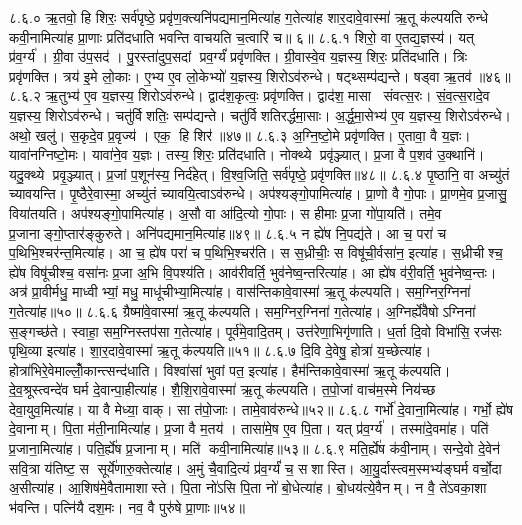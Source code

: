 ८.६.०
ऋ॒तवो॒ हि शिरः॒ सर्व॑पृष्ठे॒ प्रवृ॑ण॒क्त्यनि॑पद्यमान॒मित्या॑ह ग॒तेत्या॑ह शार॒दावे॒वास्मा॑ ऋ॒तू क॑ल्पयति रुन्धे कवी॒नामित्या॑ह प्रा॒णाः प्रति॑दधाति भवन्ति वाचयति च॒त्वारि॑ च॥ ६॥
८.६.१
शिरो॒ वा ए॒तद्य॒ज्ञस्य॑। यत् प्र॑व॒र्ग्य॑। ग्री॒वा उ॑प॒सद॑। पु॒रस्ता॑दुप॒सदां प्रव॒र्ग्यं॑ प्रवृ॑णक्ति। ग्री॒वास्वे॒व य॒ज्ञस्य॒ शिरः॒ प्रति॑दधाति। त्रिः प्रवृ॑णक्ति। त्रय॑ इ॒मे लो॒काः। ए॒भ्य ए॒व लो॒केभ्यो॑ य॒ज्ञस्य॒ शिरोऽव॑रुन्धे। षट्थ्सम्प॑द्यन्ते। षड्वा ऋ॒तव॑॥४६॥
८.६.२
ऋ॒तुभ्य॑ ए॒व य॒ज्ञस्य॒ शिरोऽव॑रुन्धे। द्वाद॑श॒कृत्वः॒ प्रवृ॑णक्ति। द्वाद॑श॒ मासा संवत्स॒रः। सं॒व॒त्स॒रादे॒व य॒ज्ञस्य॒ शिरोऽव॑रुन्धे। चतु॑र्विशतिः॒ सम्प॑द्यन्ते। चतु॑र्विशतिरर्द्धमा॒साः। अ॒र्द्ध॒मा॒सेभ्य॑ ए॒व य॒ज्ञस्य॒ शिरोऽव॑रुन्धे। अथो॒ खलु॑। स॒कृदे॒व प्र॒वृज्य॑। एक॒ हि शिर॑॥४७॥
८.६.३
अ॒ग्नि॒ष्टो॒मे प्रवृ॑णक्ति। ए॒तावा॒\an{} वै य॒ज्ञः। यावा॑नग्निष्टो॒मः। यावा॑ने॒व य॒ज्ञः। तस्य॒ शिरः॒ प्रति॑दधाति। नोक्थ्ये प्रवृ॑ञ्ज्यात्। प्र॒जा वै प॒शव॑ उ॒क्थानि॑। यदु॒क्थ्ये प्रवृ॒ञ्ज्यात्। प्र॒जां प॒शून॑स्य॒ निर्द॑हेत्। वि॒श्व॒जिति॒ सर्व॑पृष्ठे॒ प्रवृ॑णक्ति॥४८॥
८.६.४
पृ॒ष्ठानि॒ वा अच्यु॑तं च्यावयन्ति। पृ॒ष्ठैरे॒वास्मा॒ अच्यु॑तं च्यावयि॒त्वाऽव॑रुन्धे। अप॑श्यङ्गो॒पामित्या॑ह। प्रा॒णो वै गो॒पाः। प्रा॒णमे॒व प्र॒जासु॒ विया॑तयति। अप॑श्यङ्गो॒पामित्या॑ह। अ॒सौ वा आ॑दि॒त्यो गो॒पाः। स हीमाः प्र॒जा गो॑पा॒यति॑। तमे॒व प्र॒जानाङ्गो॒प्तार॑ङ्कुरुते। अनि॑पद्यमान॒मित्या॑ह॥४९॥
८.६.५
न ह्ये॑ष नि॒पद्य॑ते। आ च॒ परा॑ च प॒थिभि॒श्चर॑न्त॒मित्या॑ह। आ च॒ ह्ये॑ष परा॑ च प॒थिभि॒श्चर॑ति। स स॒ध्रीचीः॒ स विषू॑ची॒र्वसा॑न॒ इत्या॑ह। स॒ध्रीचीश्च॒ ह्ये॑ष विषू॑चीश्च॒ वसा॑नः प्र॒जा अ॒भि वि॒पश्य॑ति। आव॑रीवर्ति॒ भुव॑नेष्व॒न्तरित्या॑ह। आ ह्ये॑ष व॑री॒वर्ति॒ भुव॑नेष्व॒न्तः। अत्र॑ प्रा॒वीर्मधु॒ माध्वीभ्यां॒ मधु॒ माधू॑चीभ्या॒मित्या॑ह। वास॑न्तिकावे॒वास्मा॑ ऋ॒तू क॑ल्पयति। सम॒ग्निर॒ग्निना॑ ग॒तेत्या॑ह॥५०॥
८.६.६
ग्रैष्मा॑वे॒वास्मा॑ ऋ॒तू क॑ल्पयति। सम॒ग्निर॒ग्निना॑ ग॒तेत्या॑ह। अ॒ग्निर्ह्ये॑वैषोऽग्निना॑ स॒ङ्गच्छ॑ते। स्वाहा॒ सम॒ग्निस्तप॑सा ग॒तेत्या॑ह। पूर्व॑मे॒वादि॒तम्। उत्त॑रेणा॒भिगृ॑णाति। ध॒र्ता दि॒वो विभा॑सि॒ रज॑सः पृथि॒व्या इत्या॑ह। शा॒र॒दावे॒वास्मा॑ ऋ॒तू क॑ल्पयति॥५१॥
८.६.७
दि॒वि दे॒वेषु॒ होत्रा॑ य॒च्छेत्या॑ह। होत्रा॑भिरे॒वेमाल्लोँ॒कान्त्सन्द॑धाति। विश्वा॑सां भुवां पत॒ इत्या॑ह। हैम॑न्तिकावे॒वास्मा॑ ऋ॒तू क॑ल्पयति। दे॒व॒श्रूस्त्वन्दे॑व घर्म दे॒वान्पा॒हीत्या॑ह। शै॒शि॒रावे॒वास्मा॑ ऋ॒तू क॑ल्पयति। त॒पो॒जां वाच॑म॒स्मे निय॑च्छ देवा॒युव॒मित्या॑ह। या वै मेध्या॒ वाक्। सा त॑पो॒जाः। तामे॒वाव॑रुन्धे॥५२॥
८.६.८
गर्भो॑ दे॒वाना॒मित्या॑ह। गर्भो॒ ह्ये॑ष दे॒वानाम्। पि॒ता म॑ती॒नामित्या॑ह। प्र॒जा वै म॒तय॑। तासा॑मे॒ष ए॒व पि॒ता। यत् प्र॑व॒र्ग्य॑। तस्मा॑दे॒वमा॑ह। पति॑ प्र॒जाना॒मित्या॑ह। पति॒र्ह्ये॑ष प्र॒जानाम्। मति॑ कवी॒नामित्या॑ह॥५३॥
८.६.९
मति॒र्ह्ये॑ष क॑वी॒नाम्। सन्दे॒वो दे॒वेन॑ सवि॒त्रा य॑तिष्ट॒ स सूर्ये॑णारु॒क्तेत्या॑ह। अ॒मुं चै॒वादि॒त्यं प्र॑व॒र्ग्यं॑ च॒ सशास्ति। आ॒यु॒र्दास्त्वम॒स्मभ्य॑ङ्घर्म वर्चो॒दा अ॒सीत्या॑ह। आ॒शिष॑मे॒वैतामाशास्ते। पि॒ता नो॑ऽसि पि॒ता नो॑ बो॒धेत्या॑ह। बो॒धय॑त्ये॒वैनम्। न वै॒ ते॑ऽवका॒शा भ॑वन्ति। पत्नि॑यै दश॒मः। नव॒ वै पुरु॑षे प्रा॒णाः॥५४॥
